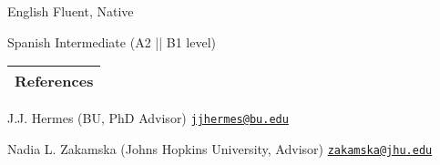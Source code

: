 \documentclass[letterpaper,11pt]{article}
\newenvironment{packed_itemize}{
\begin{itemize}[label=\raisebox{0.25ex}{\tiny$\bullet$}]
  \setlength{\itemsep}{4.2pt}
  \setlength{\parskip}{0pt}
  \setlength{\parsep}{0pt}}{\end{itemize}
}
\begin{document}
\begin{packed_itemize}
    \item English \hfill Fluent, Native
    \item Spanish \hfill Intermediate (A2 || B1 level)
\end{packed_itemize}



\noindent
\begin{tabular*}{\textwidth}{l@{\extracolsep{\fill}}}
\large {\sc \Large{References}}\\
\hline
\end{tabular*}\vspace{1.mm}

\begin{packed_itemize}
    \item J.J. Hermes (BU, PhD Advisor) \hfill \href{mailto:jjhermes@bu.edu}{\texttt{jjhermes@bu.edu}}
    \item Nadia L. Zakamska (Johns Hopkins University, Advisor) \hfill \href{mailto:zakamska@jhu.edu}{\texttt{zakamska@jhu.edu}}
\end{packed_itemize}


\vspace*{\fill}
\end{document}
